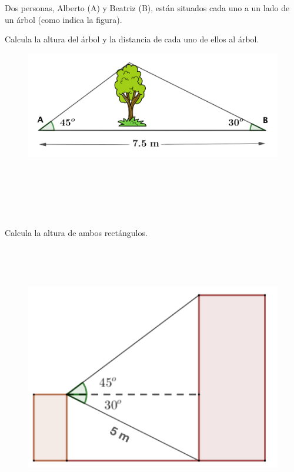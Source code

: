 \begin{mipropuesto}

\begin{multicols}{2}
Dos personas, Alberto (A) y Beatriz (B), están situados cada uno a un lado de un árbol (como indica la figura).

Calcula la altura del árbol y la distancia de cada uno de ellos al árbol.
\begin{figure}[H]
	\centering
	\includegraphics[width=.5\textwidth]{img-rt/rt34.png}
\end{figure}
\end{multicols}
	
\end{mipropuesto}

\vspace{-8mm}
\begin{flushright}
\begin{footnotesize} \textcolor{gris}{}	\end{footnotesize}
\end{flushright}


\begin{mipropuesto}

\begin{multicols}{2}
$\quad$

$\quad$

$\quad$

Calcula la altura de ambos rectángulos.

$\quad$

$\quad$

\begin{figure}[H]
	\centering
	\includegraphics[width=.4\textwidth]{img-rt/rt35.png}
\end{figure}
\end{multicols}
	
\end{mipropuesto}

